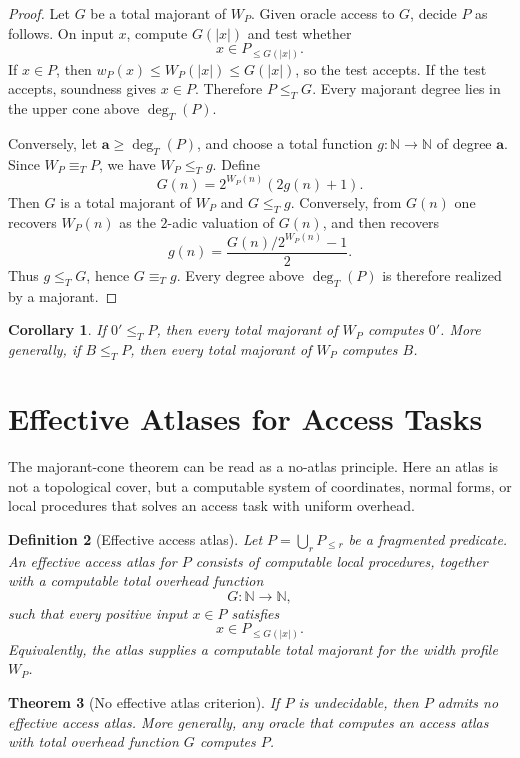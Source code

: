 \documentclass[11pt]{article}
\newtheorem{theorem}{Theorem}[section]
\newtheorem{corollary}[theorem]{Corollary}
\newtheorem{definition}[theorem]{Definition}
\begin{document}
\begin{proof}
Let \(G\) be a total majorant of \(W_P\). Given oracle access to \(G\), decide \(P\) as follows. On input \(x\), compute \(G(|x|)\) and test whether
\[
x\in P_{\le G(|x|)}.
\]
If \(x\in P\), then \(w_P(x)\le W_P(|x|)\le G(|x|)\), so the test accepts. If the test accepts, soundness gives \(x\in P\). Therefore \(P\le_T G\). Every majorant degree lies in the upper cone above \(\deg_T(P)\).

Conversely, let \(\mathbf a\ge \deg_T(P)\), and choose a total function \(g:\mathbb N\to\mathbb N\) of degree \(\mathbf a\). Since \(W_P\equiv_T P\), we have \(W_P\le_T g\). Define
\[
G(n)=2^{W_P(n)}(2g(n)+1).
\]
Then \(G\) is a total majorant of \(W_P\) and \(G\le_T g\). Conversely, from \(G(n)\) one recovers \(W_P(n)\) as the \(2\)-adic valuation of \(G(n)\), and then recovers
\[
g(n)=\frac{G(n)/2^{W_P(n)}-1}{2}.
\]
Thus \(g\le_T G\), hence \(G\equiv_T g\). Every degree above \(\deg_T(P)\) is therefore realized by a majorant.
\end{proof}

\begin{corollary}
If \(0'\le_T P\), then every total majorant of \(W_P\) computes \(0'\). More generally, if \(B\le_T P\), then every total majorant of \(W_P\) computes \(B\).
\end{corollary}

\section{Effective Atlases for Access Tasks}

The majorant-cone theorem can be read as a no-atlas principle. Here an atlas is not a topological cover, but a computable system of coordinates, normal forms, or local procedures that solves an access task with uniform overhead.

\begin{definition}[Effective access atlas]
Let \(P=\bigcup_rP_{\le r}\) be a fragmented predicate. An effective access atlas for \(P\) consists of computable local procedures, together with a computable total overhead function
\[
G:\mathbb N\to\mathbb N,
\]
such that every positive input \(x\in P\) satisfies
\[
x\in P_{\le G(|x|)}.
\]
Equivalently, the atlas supplies a computable total majorant for the width profile \(W_P\).
\end{definition}

\begin{theorem}[No effective atlas criterion]
If \(P\) is undecidable, then \(P\) admits no effective access atlas. More generally, any oracle that computes an access atlas with total overhead function \(G\) computes \(P\).
\end{theorem}
\end{document}
